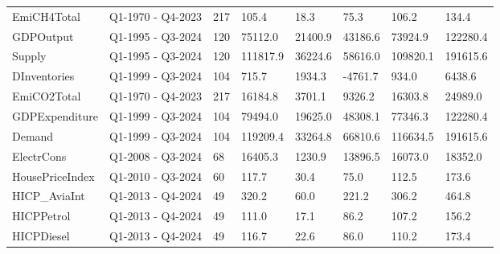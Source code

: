 \begin{longtable}[t]{llllllll}
EmiCH4Total & Q1-1970 - Q4-2023 & 217 & 105.4 & 18.3 & 75.3 & 106.2 & 134.4\\
GDPOutput & Q1-1995 - Q3-2024 & 120 & 75112.0 & 21400.9 & 43186.6 & 73924.9 & 122280.4\\
Supply & Q1-1995 - Q3-2024 & 120 & 111817.9 & 36224.6 & 58616.0 & 109820.1 & 191615.6\\
DInventories & Q1-1999 - Q3-2024 & 104 & 715.7 & 1934.3 & -4761.7 & 934.0 & 6438.6\\
\addlinespace
EmiCO2Total & Q1-1970 - Q4-2023 & 217 & 16184.8 & 3701.1 & 9326.2 & 16303.8 & 24989.0\\
GDPExpenditure & Q1-1999 - Q3-2024 & 104 & 79494.0 & 19625.0 & 48308.1 & 77346.3 & 122280.4\\
Demand & Q1-1999 - Q3-2024 & 104 & 119209.4 & 33264.8 & 66810.6 & 116634.5 & 191615.6\\
ElectrCons & Q1-2008 - Q3-2024 & 68 & 16405.3 & 1230.9 & 13896.5 & 16073.0 & 18352.0\\
HousePriceIndex & Q1-2010 - Q3-2024 & 60 & 117.7 & 30.4 & 75.0 & 112.5 & 173.6\\
\addlinespace
HICP\_AviaInt & Q1-2013 - Q4-2024 & 49 & 320.2 & 60.0 & 221.2 & 306.2 & 464.8\\
HICPPetrol & Q1-2013 - Q4-2024 & 49 & 111.0 & 17.1 & 86.2 & 107.2 & 156.2\\
HICPDiesel & Q1-2013 - Q4-2024 & 49 & 116.7 & 22.6 & 86.0 & 110.2 & 173.4\\
\bottomrule
\end{longtable}
\endgroup{}

